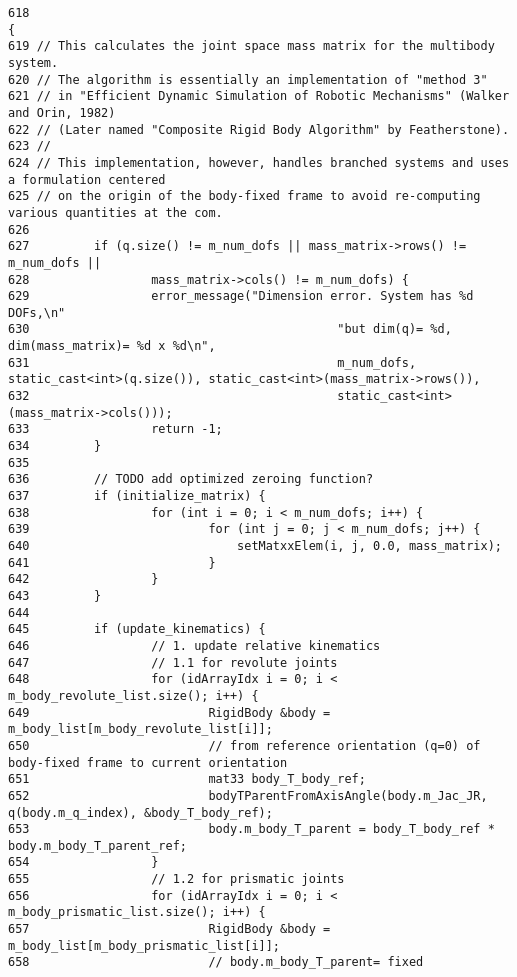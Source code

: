 \begin{Code}\begin{verbatim}618                                                                                                                               {
619 // This calculates the joint space mass matrix for the multibody system.
620 // The algorithm is essentially an implementation of "method 3"
621 // in "Efficient Dynamic Simulation of Robotic Mechanisms" (Walker and Orin, 1982)
622 // (Later named "Composite Rigid Body Algorithm" by Featherstone).
623 //
624 // This implementation, however, handles branched systems and uses a formulation centered
625 // on the origin of the body-fixed frame to avoid re-computing various quantities at the com.
626 
627         if (q.size() != m_num_dofs || mass_matrix->rows() != m_num_dofs ||
628                 mass_matrix->cols() != m_num_dofs) {
629                 error_message("Dimension error. System has %d DOFs,\n"
630                                           "but dim(q)= %d, dim(mass_matrix)= %d x %d\n",
631                                           m_num_dofs, static_cast<int>(q.size()), static_cast<int>(mass_matrix->rows()),
632                                           static_cast<int>(mass_matrix->cols()));
633                 return -1;
634         }
635 
636         // TODO add optimized zeroing function?
637         if (initialize_matrix) {
638                 for (int i = 0; i < m_num_dofs; i++) {
639                         for (int j = 0; j < m_num_dofs; j++) {
640                             setMatxxElem(i, j, 0.0, mass_matrix);
641                         }
642                 }
643         }
644 
645         if (update_kinematics) {
646                 // 1. update relative kinematics
647                 // 1.1 for revolute joints
648                 for (idArrayIdx i = 0; i < m_body_revolute_list.size(); i++) {
649                         RigidBody &body = m_body_list[m_body_revolute_list[i]];
650                         // from reference orientation (q=0) of body-fixed frame to current orientation
651                         mat33 body_T_body_ref;
652                         bodyTParentFromAxisAngle(body.m_Jac_JR, q(body.m_q_index), &body_T_body_ref);
653                         body.m_body_T_parent = body_T_body_ref * body.m_body_T_parent_ref;
654                 }
655                 // 1.2 for prismatic joints
656                 for (idArrayIdx i = 0; i < m_body_prismatic_list.size(); i++) {
657                         RigidBody &body = m_body_list[m_body_prismatic_list[i]];
658                         // body.m_body_T_parent= fixed

\end{verbatim}
\end{Code}
